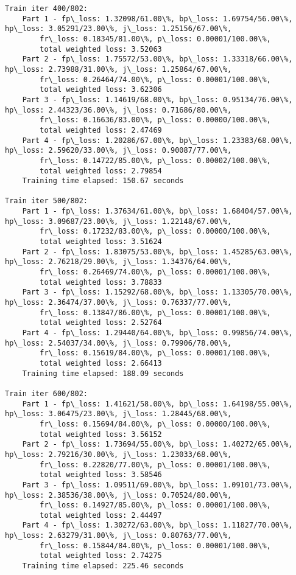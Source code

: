 \documentclass[11pt]{article}
\begin{document}
\begin{Verbatim}[commandchars=\\\{\}]
Train iter 400/802:
	Part 1 - fp\_loss: 1.32098/61.00\%, bp\_loss: 1.69754/56.00\%, hp\_loss: 3.05291/23.00\%, j\_loss: 1.25156/67.00\%, 
		fr\_loss: 0.18345/81.00\%, p\_loss: 0.00001/100.00\%, 
		total weighted loss: 3.52063
	Part 2 - fp\_loss: 1.75572/53.00\%, bp\_loss: 1.33318/66.00\%, hp\_loss: 2.73988/31.00\%, j\_loss: 1.25864/67.00\%, 
		fr\_loss: 0.26464/74.00\%, p\_loss: 0.00001/100.00\%, 
		total weighted loss: 3.62306
	Part 3 - fp\_loss: 1.14619/68.00\%, bp\_loss: 0.95134/76.00\%, hp\_loss: 2.44323/36.00\%, j\_loss: 0.71686/80.00\%, 
		fr\_loss: 0.16636/83.00\%, p\_loss: 0.00000/100.00\%, 
		total weighted loss: 2.47469
	Part 4 - fp\_loss: 1.20286/67.00\%, bp\_loss: 1.23383/68.00\%, hp\_loss: 2.59620/33.00\%, j\_loss: 0.90087/77.00\%, 
		fr\_loss: 0.14722/85.00\%, p\_loss: 0.00002/100.00\%, 
		total weighted loss: 2.79854
	Training time elapsed: 150.67 seconds

Train iter 500/802:
	Part 1 - fp\_loss: 1.37634/61.00\%, bp\_loss: 1.68404/57.00\%, hp\_loss: 3.09687/23.00\%, j\_loss: 1.22148/67.00\%, 
		fr\_loss: 0.17232/83.00\%, p\_loss: 0.00000/100.00\%, 
		total weighted loss: 3.51624
	Part 2 - fp\_loss: 1.83075/53.00\%, bp\_loss: 1.45285/63.00\%, hp\_loss: 2.76218/29.00\%, j\_loss: 1.34376/64.00\%, 
		fr\_loss: 0.26469/74.00\%, p\_loss: 0.00001/100.00\%, 
		total weighted loss: 3.78833
	Part 3 - fp\_loss: 1.15292/68.00\%, bp\_loss: 1.13305/70.00\%, hp\_loss: 2.36474/37.00\%, j\_loss: 0.76337/77.00\%, 
		fr\_loss: 0.13847/86.00\%, p\_loss: 0.00001/100.00\%, 
		total weighted loss: 2.52764
	Part 4 - fp\_loss: 1.29440/64.00\%, bp\_loss: 0.99856/74.00\%, hp\_loss: 2.54037/34.00\%, j\_loss: 0.79906/78.00\%, 
		fr\_loss: 0.15619/84.00\%, p\_loss: 0.00001/100.00\%, 
		total weighted loss: 2.66413
	Training time elapsed: 188.09 seconds

Train iter 600/802:
	Part 1 - fp\_loss: 1.41621/58.00\%, bp\_loss: 1.64198/55.00\%, hp\_loss: 3.06475/23.00\%, j\_loss: 1.28445/68.00\%, 
		fr\_loss: 0.15694/84.00\%, p\_loss: 0.00000/100.00\%, 
		total weighted loss: 3.56152
	Part 2 - fp\_loss: 1.73694/55.00\%, bp\_loss: 1.40272/65.00\%, hp\_loss: 2.79216/30.00\%, j\_loss: 1.23033/68.00\%, 
		fr\_loss: 0.22820/77.00\%, p\_loss: 0.00001/100.00\%, 
		total weighted loss: 3.58546
	Part 3 - fp\_loss: 1.09511/69.00\%, bp\_loss: 1.09101/73.00\%, hp\_loss: 2.38536/38.00\%, j\_loss: 0.70524/80.00\%, 
		fr\_loss: 0.14927/85.00\%, p\_loss: 0.00001/100.00\%, 
		total weighted loss: 2.44497
	Part 4 - fp\_loss: 1.30272/63.00\%, bp\_loss: 1.11827/70.00\%, hp\_loss: 2.63279/31.00\%, j\_loss: 0.80763/77.00\%, 
		fr\_loss: 0.15844/84.00\%, p\_loss: 0.00001/100.00\%, 
		total weighted loss: 2.74275
	Training time elapsed: 225.46 seconds


\end{Verbatim}
\end{document}
